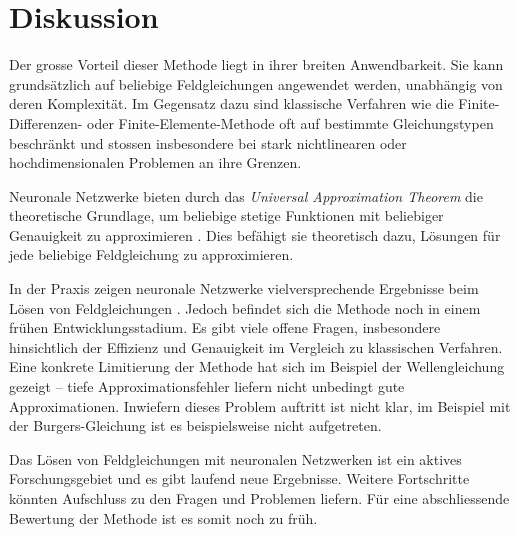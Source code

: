 %
%
%
%

\section{Diskussion}\label{neuronal:section:diskussion}

Der grosse Vorteil dieser Methode liegt in ihrer breiten Anwendbarkeit.
Sie kann grundsätzlich auf beliebige Feldgleichungen angewendet werden, unabhängig von deren Komplexität.
Im Gegensatz dazu sind klassische Verfahren wie die Finite-Differenzen- oder Finite-Elemente-Methode oft auf bestimmte Gleichungstypen beschränkt und stossen insbesondere bei stark nichtlinearen oder hochdimensionalen Problemen an ihre Grenzen.

Neuronale Netzwerke bieten durch das \emph{Universal Approximation Theorem} die theoretische Grundlage, um beliebige stetige Funktionen mit beliebiger Genauigkeit zu approximieren \cite{neuronal:universal_approximation_theorem}.
Dies befähigt sie theoretisch dazu, Lösungen für jede beliebige Feldgleichung zu approximieren.

In der Praxis zeigen neuronale Netzwerke vielversprechende Ergebnisse beim Lösen von Feldgleichungen \cite{neuronal:pinns}.
Jedoch befindet sich die Methode noch in einem frühen Entwicklungsstadium.
Es gibt viele offene Fragen, insbesondere hinsichtlich der Effizienz und Genauigkeit im Vergleich zu klassischen Verfahren.
Eine konkrete Limitierung der Methode hat sich im Beispiel der Wellengleichung gezeigt -- tiefe Approximationsfehler liefern nicht unbedingt gute Approximationen.
Inwiefern dieses Problem auftritt ist nicht klar, im Beispiel mit der Burgers-Gleichung ist es beispielsweise nicht aufgetreten.

Das Lösen von Feldgleichungen mit neuronalen Netzwerken ist ein aktives Forschungsgebiet und es gibt laufend neue Ergebnisse.
Weitere Fortschritte könnten Aufschluss zu den Fragen und Problemen liefern.
Für eine abschliessende Bewertung der Methode ist es somit noch zu früh.


